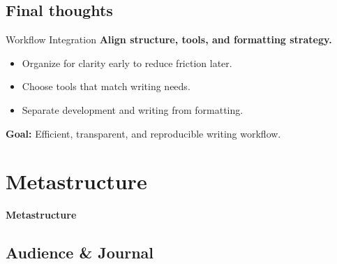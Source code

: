 \documentclass{beamer}
\begin{document}
\subsection{Final thoughts}
\begin{frame}{Workflow Integration}
\textbf{Align structure, tools, and formatting strategy.}

\begin{itemize}
    \item Organize for clarity early to reduce friction later.
    \item Choose tools that match writing needs.
    \item Separate development and writing from formatting.
\end{itemize}

\begin{block}{\textbf{Goal:}}
    Efficient, transparent, and reproducible writing workflow.
\end{block}
\end{frame}



\section{Metastructure}

\begin{frame}
  \centering
  \vfill
  {\Large\bfseries Metastructure}
  \vfill
\end{frame}



\subsection{Audience \& Journal}
\end{document}
